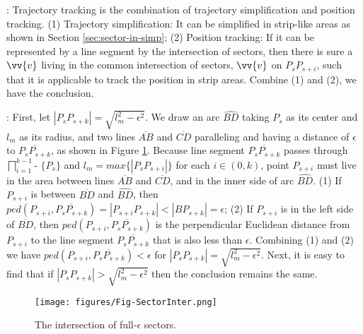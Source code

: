:
Trajectory tracking is the combination of trajectory simplification and position tracking.
%
(1) Trajectory simplification: It can be simplified in strip-like areas as shown in Section \ref{sec:sector-in-simp};
%
(2) Position tracking: If it can be represented by a line segment by the intersection of sectors, then there is sure a $\vv{v}$ living in the common intersection of sectors, \eg $\vv{v}$ on $P_sP_{s+i}$, such that it is applicable to track the position in strip areas.
%
Combine (1) and (2), we have the conclusion.
\eop


:
First, let $|P_sP_{s+k}| = \sqrt{l_m^2 - \epsilon^2}$. We draw an arc $\widehat{BD}$ taking $P_s$ as its center and $l_m$ as its radius, and two lines $\overline{AB}$ and $\overline{CD}$ paralleling and having a distance of $\epsilon$ to $\overline{P_sP_{s+k}}$, as shown in Figure \ref{fig:sectorinter}.
Because line segment $\overline{P_sP_{s+k}}$ passes through $\bigsqcap_{i=1}^{k-1}$- $\{P_s\}$ and $l_{m} = max\{|P_sP_{s+i}|\}$ for each $i \in (0, k)$, point $P_{s+i}$ must live in the area between lines $\overline{AB}$ and $\overline{CD}$, and in the inner side of arc $\widehat{BD}$.
(1) If $P_{s+i}$ is between $\overline{BD}$ and $\widehat{BD}$, then $ped(P_{s+i}, \overline{P_sP_{s+k}}) = |{P_{s+i}P_{s+k}}| < |{BP_{s+k}}| = \epsilon$; 
(2) If $P_{s+i}$ is in the left side of $\overline{BD}$, then  $ped(P_{s+i}, \overline{P_sP_{s+k}})$ is the perpendicular Euclidean distance from $P_{s+i}$ to the line segment $\overline{P_sP_{s+k}}$ that is also less than $\epsilon$. Combining (1) and (2) we have $ped(P_{s+i}, \overline{P_sP_{s+k}})< \epsilon$ for $|P_sP_{s+k}| = \sqrt{l_m^2 - \epsilon^2}$.
Next, it is easy to find that if $|P_sP_{s+k}| > \sqrt{l_m^2 - \epsilon^2}$ then the conclusion remains the same.
\eop

\begin{figure}[tb!]
	\centering
	\texttt{[image: figures/Fig-SectorInter.png]}
	\vspace{-2ex}
	\caption{\small The intersection of full-$\epsilon$ sectors.  }
	\vspace{-1ex}
	\label{fig:sectorinter}
\end{figure}

